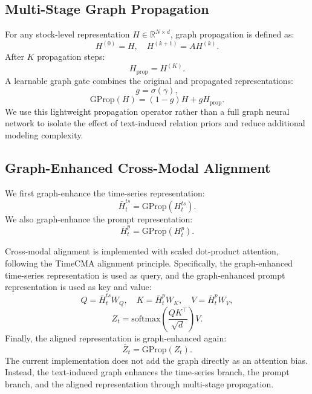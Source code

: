 \documentclass[11pt]{article}
\begin{document}
\subsection{Multi-Stage Graph Propagation}

For any stock-level representation $H \in \mathbb{R}^{N \times d}$, graph propagation is defined as:
\begin{equation}
H^{(0)} = H, \quad H^{(k+1)} = A H^{(k)}.
\end{equation}
After $K$ propagation steps:
\begin{equation}
H_{\text{prop}} = H^{(K)}.
\end{equation}
A learnable graph gate combines the original and propagated representations:
\begin{equation}
g = \sigma(\gamma),
\end{equation}
\begin{equation}
\text{GProp}(H) = (1-g)H + gH_{\text{prop}}.
\end{equation}
We use this lightweight propagation operator rather than a full graph neural network to isolate the effect of text-induced relation priors and reduce additional modeling complexity.

\subsection{Graph-Enhanced Cross-Modal Alignment}

We first graph-enhance the time-series representation:
\begin{equation}
\bar{H}^{ts}_t = \text{GProp}(H^{ts}_t).
\end{equation}
We also graph-enhance the prompt representation:
\begin{equation}
\bar{H}^{p}_t = \text{GProp}(H^{p}_t).
\end{equation}

Cross-modal alignment is implemented with scaled dot-product attention, following the TimeCMA alignment principle. Specifically, the graph-enhanced time-series representation is used as query, and the graph-enhanced prompt representation is used as key and value:
\begin{equation}
Q = \bar{H}^{ts}_t W_Q, \quad
K = \bar{H}^{p}_t W_K, \quad
V = \bar{H}^{p}_t W_V,
\end{equation}
\begin{equation}
Z_t = \text{softmax}\left(\frac{QK^\top}{\sqrt{d}}\right)V.
\end{equation}
Finally, the aligned representation is graph-enhanced again:
\begin{equation}
\bar{Z}_t = \text{GProp}(Z_t).
\end{equation}
The current implementation does not add the graph directly as an attention bias. Instead, the text-induced graph enhances the time-series branch, the prompt branch, and the aligned representation through multi-stage propagation.
\end{document}
